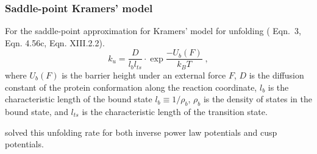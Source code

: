 \subsubsection{Saddle-point Kramers' model}

For the saddle-point approximation for Kramers' model for unfolding
(\citet{evans97} Eqn.~3, \citet{hanggi90} Eqn. 4.56c, \citet{vanKampen07} Eqn. XIII.2.2).
\begin{equation}
  k_u = \frac{D}{l_b l_{ts}} \cdot \exp{\frac{-U_b(F)}{k_B T}} \;,
    \label{eq:kramers-saddle}
\end{equation}
where $U_b(F)$ is the barrier height under an external force $F$,
$D$ is the diffusion constant of the protein conformation along the reaction coordinate,
$l_b$ is the characteristic length of the bound state $l_b \equiv 1/\rho_b$,
$\rho_b$ is the density of states in the bound state, and
$l_{ts}$ is the characteristic length of the transition state.
%

\citet{evans97} solved this unfolding rate for both inverse power law
potentials and cusp potentials.
